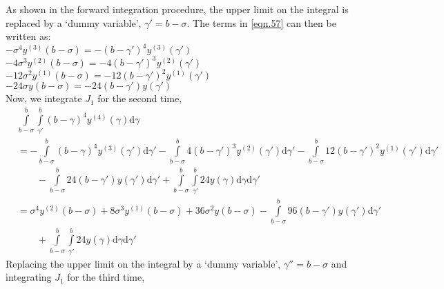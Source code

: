\documentclass{article}
\begin{document}
As shown in the forward integration procedure, the upper limit on the integral is replaced by a \lq dummy variable\rq, $\gamma'=b-\sigma$. The terms in \eqref{eqn.57} can then be written as:
\vspace{\baselineskip}\\
$-\sigma^4y^{(3)}(b-\sigma) = -(b-\gamma')^4y^{(3)}(\gamma')$\\
$- 4\sigma^3y^{(2)}(b-\sigma) = -4(b-\gamma')^3y^{(2)}(\gamma')$\\
$-12\sigma^2y^{(1)}(b-\sigma) = -12(b-\gamma')^2y^{(1)}(\gamma')$\\
$-24\sigma y(b-\sigma) = -24(b-\gamma')y(\gamma')$\\ 
Now, we integrate $J_1$ for the second time,
\begin{equation}\label{eqn.58}
\begin{split}
	&\int\limits_{b-\sigma}^{b}\int\limits_{\gamma'}^{b}(b-\gamma)^4y^{(4)}(\gamma)\mathrm{d}\gamma\\
	&=-\int\limits_{b-\sigma}^{b}(b-\gamma)^4y^{(3)}(\gamma')\mathrm{d}\gamma'-\int\limits_{b-\sigma}^{b}4(b-\gamma')^3y^{(2)}(\gamma')\mathrm{d}\gamma'-\int\limits_{b-\sigma}^{b}12(b-\gamma')^2y^{(1)}(\gamma')\mathrm{d}\gamma'\\
	&\qquad{}-\int\limits_{b-\sigma}^{b}24(b-\gamma')y(\gamma')\mathrm{d}\gamma' + \int\limits_{b-\sigma}^{b}\int\limits_{\gamma'}^{b}24y(\gamma)\mathrm{d}\gamma\mathrm{d}\gamma'\\
	&=\sigma^4y^{(2)}(b-\sigma) + 8\sigma^3y^{(1)}(b-\sigma) + 36\sigma^2y(b-\sigma) - \int\limits_{b-\sigma}^{b}96(b-\gamma')y(\gamma')\mathrm{d}\gamma'\\
	&\qquad{}+\int\limits_{b-\sigma}^{b}\int\limits_{\gamma'}^{b}24y(\gamma)\mathrm{d}\gamma\mathrm{d}\gamma'
\end{split}
\end{equation}
Replacing the upper limit on the integral by a \lq dummy variable\rq, $\gamma'' = b-\sigma$ and integrating $J_1$ for the third time,
\end{document}
